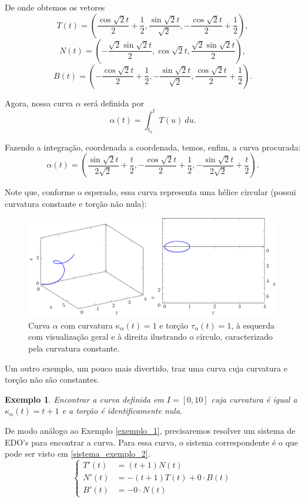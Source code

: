 \documentclass{article}
\newtheorem{example}{Exemplo}
\begin{document}
De onde obtemos os vetores
\[T(t) = \left(\dfrac{\cos{\sqrt{2}t}}{2} + \dfrac{1}{2}, \dfrac{\sin{\sqrt{2}t}}{\sqrt{2}}, - \dfrac{\cos{\sqrt{2}t}}{2} + \dfrac{1}{2}\right),\]
\[N(t) = \left(- \dfrac{\sqrt{2}\sin{\sqrt{2}t}}{2}, \cos{\sqrt{2}t}, \dfrac{\sqrt{2}\sin{\sqrt{2}t}}{2}\right),\]
\[B(t) = \left(- \dfrac{\cos{\sqrt{2}t}}{2} + \dfrac{1}{2}, -\dfrac{\sin{\sqrt{2}t}}{\sqrt{2}}, \dfrac{\cos{\sqrt{2}t}}{2} + \dfrac{1}{2}\right).\]

Agora, nossa curva $\alpha$ será definida por
\[\alpha(t) = \int_{t_0}^{t} T(u) ~du.\]

Fazendo a integração, coordenada a coordenada, temos, enfim, a curva procurada:
\[\alpha(t) = \left(\dfrac{\sin{\sqrt{2}t}}{2\sqrt{2}} + \dfrac{t}{2}, -\dfrac{\cos{\sqrt{2}t}}{2} + \dfrac{1}{2}, -\dfrac{\sin{\sqrt{2}t}}{2\sqrt{2}} + \dfrac{t}{2}\right).\]

Note que, conforme o esperado, essa curva representa uma hélice circular (possui curvatura constante e torção não nula):
\begin{figure}[H]
    \centering
    \includegraphics{Tikz1.pdf}
    \caption{Curva $\alpha$ com curvatura $\kappa_\alpha(t) = 1$ e torção $\tau_\alpha(t) = 1$, à esquerda com visualização geral e à direita ilustrando o círculo, caracterizado pela curvatura constante.}
\end{figure}

Um outro exemplo, um pouco mais divertido, traz uma curva cuja curvatura e torção não são constantes.

\begin{example}
    Encontrar a curva definida em $I = [0, 10]$ cuja curvatura é igual a $\kappa_\alpha(t) = t + 1$ e a torção é identificamente nula.
\end{example}

 De modo análogo ao Exemplo \ref{exemplo_1}, precisaremos resolver um sistema de EDO's para encontrar a curva. Para essa curva, o sistema correspondente é o que pode ser visto em \ref{sistema_exemplo_2}.
\begin{equation}
    \label{sistema_exemplo_2}
    \left\{
        \begin{array}{rl}
            T'(t) & = (t + 1)N(t) \\
            N'(t) & = - (t + 1)T(t) + 0\cdot B(t) \\
            B'(t) & = - 0\cdot N(t)
        \end{array}
    \right.
\end{equation}
\end{document}
